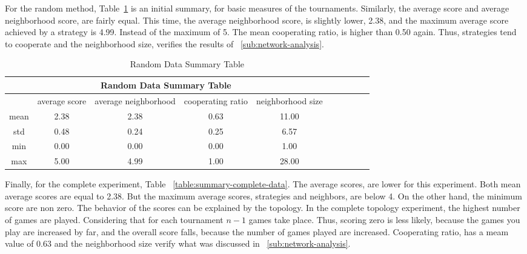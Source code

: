 For the random method, Table~\ref{summary-random-data} is an initial summary,
for basic measures of the tournaments. Similarly, the average score and average
neighborhood score, are fairly equal. This time, the average neighborhood score,
is slightly lower, 2.38, and the maximum average score achieved by a strategy
is 4.99. Instead of the maximum of 5. The mean cooperating ratio, is higher
than 0.50 again. Thus, strategies tend to cooperate and the neighborhood size,
verifies the results of ~\ref{sub:network-analysis}.

\begin{table}[!hbtp]
	\centering
	\begin{adjustbox}{width=0.8\textwidth}
		\small
		\begin{tabular}{cccccccccc}
				\toprule
			\multicolumn{5}{|c|}{Random Data Summary Table}                                      \\ \hline
			     & average score & average neighborhood & cooperating ratio & neighborhood size \\ \hline
			mean & 2.38          & 2.38                 & 0.63              & 11.00             \\ \hline
			std  & 0.48          & 0.24                 & 0.25              & 6.57              \\ \hline
			min  & 0.00          & 0.00                 & 0.00              & 1.00              \\ \hline
			max  & 5.00          & 4.99                 & 1.00              & 28.00             \\ \bottomrule
		\end{tabular}
	\end{adjustbox}
	\caption{Random Data Summary Table}
	\label{summary-random-data}
\end{table}

Finally, for the complete experiment, Table ~\ref{table:summary-complete-data}. The
average scores, are lower for this experiment. Both mean average scores are
equal to 2.38. But the maximum average scores, strategies and neighbors, are
below 4. On the other hand, the minimum score are non zero. The behavior of the
scores can be explained by the topology. In the complete topology experiment,
the highest number of games are played. Considering that for each tournament
\(n-1\) games take place. Thus, scoring zero is less likely, because the games
you play are increased by far, and the overall score falls, because the number
of games played are increased.
Cooperating ratio, has a meam value of 0.63 and the neighborhood size
verify what was discussed in ~\autoref{sub:network-analysis}.

